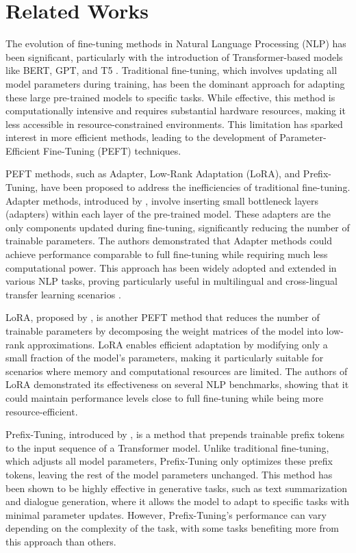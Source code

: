 \section{Related Works}

The evolution of fine-tuning methods in Natural Language Processing (NLP) has been significant, particularly with the introduction of Transformer-based models like BERT, GPT, and T5 \cite{bert, gpt, T5}. Traditional fine-tuning, which involves updating all model parameters during training, has been the dominant approach for adapting these large pre-trained models to specific tasks. While effective, this method is computationally intensive and requires substantial hardware resources, making it less accessible in resource-constrained environments. This limitation has sparked interest in more efficient methods, leading to the development of Parameter-Efficient Fine-Tuning (PEFT) techniques.

PEFT methods, such as Adapter, Low-Rank Adaptation (LoRA), and Prefix-Tuning, have been proposed to address the inefficiencies of traditional fine-tuning. Adapter methods, introduced by \citeauthor{adapter_houlsby} \cite{adapter_houlsby}, involve inserting small bottleneck layers (adapters) within each layer of the pre-trained model. These adapters are the only components updated during fine-tuning, significantly reducing the number of trainable parameters. The authors demonstrated that Adapter methods could achieve performance comparable to full fine-tuning while requiring much less computational power. This approach has been widely adopted and extended in various NLP tasks, proving particularly useful in multilingual and cross-lingual transfer learning scenarios \cite{adapters}.

LoRA, proposed by \citeauthor{lora} \cite{lora}, is another PEFT method that reduces the number of trainable parameters by decomposing the weight matrices of the model into low-rank approximations. LoRA enables efficient adaptation by modifying only a small fraction of the model's parameters, making it particularly suitable for scenarios where memory and computational resources are limited. The authors of LoRA demonstrated its effectiveness on several NLP benchmarks, showing that it could maintain performance levels close to full fine-tuning while being more resource-efficient.

Prefix-Tuning, introduced by \citeauthor{prefix_tuning} \cite{prefix_tuning}, is a method that prepends trainable prefix tokens to the input sequence of a Transformer model. Unlike traditional fine-tuning, which adjusts all model parameters, Prefix-Tuning only optimizes these prefix tokens, leaving the rest of the model parameters unchanged. This method has been shown to be highly effective in generative tasks, such as text summarization and dialogue generation, where it allows the model to adapt to specific tasks with minimal parameter updates. However, Prefix-Tuning's performance can vary depending on the complexity of the task, with some tasks benefiting more from this approach than others.

